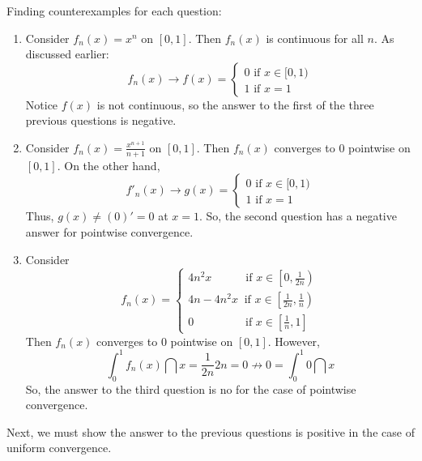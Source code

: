 \begin{eg}
    Finding counterexamples for each question:
    \begin{enumerate}
        \item Consider $f_n(x) = x^n$ on $[0,1]$. Then $f_n(x)$ is continuous for all $n$. As discussed earlier:
            \begin{equation*}
                f_n(x) \to f(x) = \begin{cases}
                    0 \text{ if } x \in [0,1) \\
                    1 \text{ if } x = 1
                \end{cases}
            \end{equation*}
        Notice $f(x)$ is not continuous, so the answer to the first of the three previous questions is negative.
        \item Consider $f_n(x) = \frac{x^{n+1}}{n+1}$ on $[0,1]$. Then $f_n(x)$ converges to $0$ pointwise on $[0,1]$. On the other hand,
            \begin{equation*}
                f'_n(x) \to g(x) = \begin{cases}
                    0 \text{ if } x \in [0,1) \\
                    1 \text{ if } x = 1
                \end{cases}
            \end{equation*}
            Thus, $g(x) \neq (0)' = 0$ at $x=1$. So, the second question has a negative answer for pointwise convergence.
        \item Consider
            \begin{equation*}
                f_n(x) = \begin{cases}
                    4n^2x \qquad \:\:\: \text{ if } x \in \left [ 0, \frac{1}{2n} \right ) \\
                    4n - 4n^2x \ \text{ if } x \in \left [\frac{1}{2n}, \frac{1}{n} \right ) \\
                    0 \qquad \qquad \: \text{ if } x \in \left [ \frac{1}{n}, 1 \right ]
                \end{cases}
            \end{equation*}
            Then $f_n(x)$ converges to $0$ pointwise on $[0,1]$. However,
            \begin{equation*}
                \int_0^1 f_n(x) \dint x = \frac{1}{2n}2n = 0 \not \to 0 = \int_0^1 0 \dint x
            \end{equation*}
            So, the answer to the third question is no for the case of pointwise convergence.
    \end{enumerate}
\end{eg}
\vspace{1em}
Next, we must show the answer to the previous questions is positive in the case of uniform convergence.

